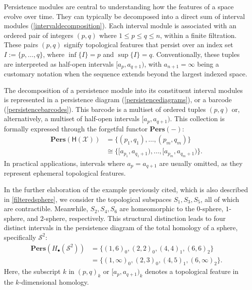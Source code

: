 Persistence modules are central to understanding how the features of a space evolve
over time. They can typically be decomposed into a direct sum of interval
modules (\ref{intervaldecomposition}). Each interval module is associated with an
ordered pair of integers $(p,q)$ where $1 \leq p \leq q \leq n$, within a finite
filtration. These pairs $(p,q)$ signify topological features that persist over an
index set $I := \{p, \ldots, q\}$, where $\inf\{I\} = p$ and $\sup\{I\} = q$. Conventionally,
these tuples are interpreted as half-open intervals $[a_{p}, a_{q+1})$, with $a_{n+1}
= \infty$ being a customary notation when the sequence extends beyond the largest
indexed space.

The decomposition of a persistence module into its constituent interval modules is
represented in a persistence diagram (\ref{persistencediagrams}), or a barcode (\ref{persistencebarcodes}).
This barcode is a multiset of ordered tuples $(p,q)$ or, alternatively, a multiset
of half-open intervals $[a_{p}, a_{q+1})$. This collection is formally expressed
through the forgetful functor $\textbf{Pers}(-)$:
\begin{align}
	\textbf{Pers}(\mathsf{H}(\mathcal{X})) & = \{(p_{1},q_{1}), \ldots, (p_{m},q_{m})\}                    \\
	                                       & \cong \{[a_{p_1}, a_{q_1+1}), \ldots, [a_{p_m}, a_{q_m+1})\}.
\end{align}
In practical applications, intervals where $a_{p} = a_{q+1}$ are usually omitted,
as they represent ephemeral topological features.

\begin{example}
	In the further elaboration of the example previously cited, which is also
	described in \ref{filteredsphere}, we consider the topological subspaces $S_{1}
	, S_{3}, S_{5}$, all of which are contractible. Meanwhile,
	$S_{2}, S_{4}, S_{6}$ are homeomorphic to the $0$-sphere, $1$-sphere, and $2$-sphere,
	respectively. This structural distinction leads to four distinct intervals in
	the persistence diagram of the total homology of a sphere, specifically $\mathcal{S}
	^{2}$:
	\begin{align}
		\textbf{Pers}(H_{\bullet}(\mathcal{S}^{2})) & = \{(1,6)_{0}, (2,2)_{0}, (4,4)_{1}, (6,6)_{2} \}             \\
		                                            & = \{(1,\infty)_{0}, (2,3)_{0}, (4,5)_{1}, (6, \infty)_{2} \}.
	\end{align}
	Here, the subscript $k$ in $(p,q)_{k}$ or $[a_{p}, a_{q+1})_{k}$ denotes a topological
	feature in the $k$-dimensional homology.
\end{example}

